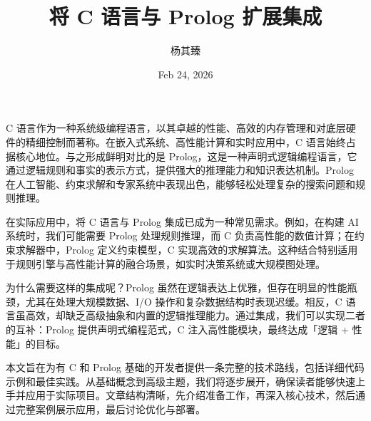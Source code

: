 \title{将 C 语言与 Prolog 扩展集成}
\author{杨其臻}
\date{Feb 24, 2026}
\maketitle
C 语言作为一种系统级编程语言，以其卓越的性能、高效的内存管理和对底层硬件的精细控制而著称。在嵌入式系统、高性能计算和实时应用中，C 语言始终占据核心地位。与之形成鲜明对比的是 Prolog，这是一种声明式逻辑编程语言，它通过逻辑规则和事实的表示方式，提供强大的推理能力和知识表达机制。Prolog 在人工智能、约束求解和专家系统中表现出色，能够轻松处理复杂的搜索问题和规则推理。\par
在实际应用中，将 C 语言与 Prolog 集成已成为一种常见需求。例如，在构建 AI 系统时，我们可能需要 Prolog 处理规则推理，而 C 负责高性能的数值计算；在约束求解器中，Prolog 定义约束模型，C 实现高效的求解算法。这种结合特别适用于规则引擎与高性能计算的融合场景，如实时决策系统或大规模图处理。\par
为什么需要这样的集成呢？Prolog 虽然在逻辑表达上优雅，但存在明显的性能瓶颈，尤其在处理大规模数据、I/O 操作和复杂数据结构时表现迟缓。相反，C 语言虽高效，却缺乏高级抽象和内置的逻辑推理能力。通过集成，我们可以实现二者的互补：Prolog 提供声明式编程范式，C 注入高性能模块，最终达成「逻辑 + 性能」的目标。\par
本文旨在为有 C 和 Prolog 基础的开发者提供一条完整的技术路线，包括详细代码示例和最佳实践。从基础概念到高级主题，我们将逐步展开，确保读者能够快速上手并应用于实际项目。文章结构清晰，先介绍准备工作，再深入核心技术，然后通过完整案例展示应用，最后讨论优化与部署。\par
